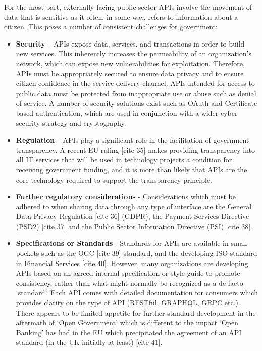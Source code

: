 For the most part, externally facing public sector APIs involve the movement
of data that is sensitive as it often, in some way, refers to information about
a citizen. This poses a number of consistent challenges for government:
\begin{itemize}
	\item \textbf{Security} – APIs expose data, services, and transactions in order to
	build new services. This inherently increases the permeability of an
	organization’s network, which can expose new vulnerabilities for
	exploitation. Therefore, APIs must be appropriately secured to ensure data
	privacy and to ensure citizen confidence in the service delivery channel.
	APIs intended for access to public data must be protected from inappropriate
	use or abuse such as denial of service. A number of security solutions exist
	such as OAuth and Certificate based authentication, which are used in
	conjunction with a wider cyber security strategy and cryptography.
	
	\item \textbf{Regulation} – APIs play a significant role in the facilitation of
	government transparency. A recent EU ruling [cite 35] makes providing
	transparency into all IT services that will be used in technology projects
	a condition for receiving government funding, and it is more than likely
	that APIs are the core technology required to support the transparency
	principle.
	
	\item \textbf{Further regulatory considerations} - Considerations which
	must be adhered to when	sharing data through any type of interface are
	the General Data Privacy Regulation [cite 36] (GDPR), the Payment
	Services Directive	(PSD2) [cite 37] and the Public Sector Information
	Directive (PSI) [cite 38].
	
	\item \textbf{Specifications or Standards} - Standards for APIs are available in
	small pockets such as the OGC [cite 39]	standard, and the developing ISO
	standard in Financial Services [cite 40]. However, many organizations are
	developing APIs based on an agreed internal specification or style guide
	to promote consistency, rather than what might normally be recognized as
	a de facto ‘standard’. Each API comes with detailed documentation for
	consumers which	provides clarity on the type of API	(RESTful, GRAPHQL,
	GRPC etc.). There appears to be limited appetite for further standard
	development in the aftermath of ‘Open Government’ which is different 
	to the impact ‘Open Banking’ has had in the EU which precipitated the
	agreement of an API standard (in the UK initially at least) [cite 41].
\end{itemize}

